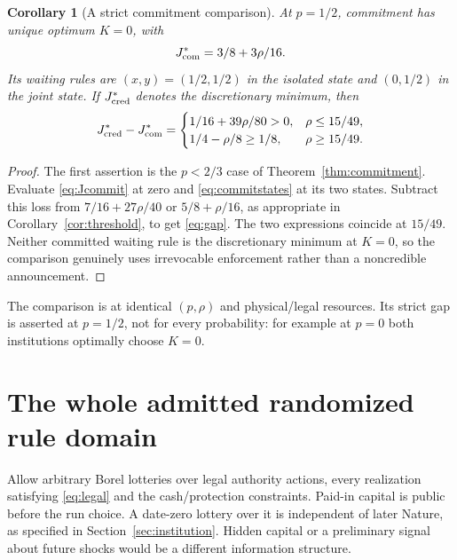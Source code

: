 \documentclass[11pt,a4paper]{article}
\numberwithin{equation}{section}
\newtheorem{corollary}[theorem]{Corollary}
\theoremstyle{definition}
\begin{document}
\begin{corollary}[A strict commitment comparison]\label{cor:gap}
At \(p=1/2\), commitment has unique optimum \(K=0\), with
\[
 J_{\rm com}^*=3/8+3\rho/16.
\]
Its waiting rules are \((x,y)=(1/2,1/2)\) in the isolated state and
\((0,1/2)\) in the joint state. If \(J_{\rm cred}^*\) denotes the
discretionary minimum, then
\begin{equation}\label{eq:gap}
J_{\rm cred}^*-J_{\rm com}^*=
\begin{cases}
1/16+39\rho/80>0,&\rho\le15/49,\\
1/4-\rho/8\ge1/8,&\rho\ge15/49.
\end{cases}
\end{equation}
\end{corollary}
\begin{proof}
The first assertion is the \(p<2/3\) case of
Theorem~\ref{thm:commitment}. Evaluate \eqref{eq:Jcommit} at zero
and \eqref{eq:commitstates} at its two states. Subtract this loss
from \(7/16+27\rho/40\) or \(5/8+\rho/16\), as appropriate in
Corollary~\ref{cor:threshold}, to get \eqref{eq:gap}. The two
expressions coincide at \(15/49\). Neither committed waiting rule is
the discretionary minimum at \(K=0\), so the comparison genuinely
uses irrevocable enforcement rather than a noncredible announcement.
\end{proof}

The comparison is at identical \((p,\rho)\) and physical/legal resources.
Its strict gap is asserted at \(p=1/2\), not for every probability:
for example at \(p=0\) both institutions optimally choose \(K=0\).

\section{The whole admitted randomized rule domain}\label{sec:random}

Allow arbitrary Borel lotteries over legal authority actions, every
realization satisfying \eqref{eq:legal} and the cash/protection constraints.
Paid-in capital is public before the run choice. A date-zero lottery
over it is independent of later Nature, as specified in
Section~\ref{sec:institution}. Hidden capital or a preliminary signal
about future shocks would be a different information structure.
\end{document}
